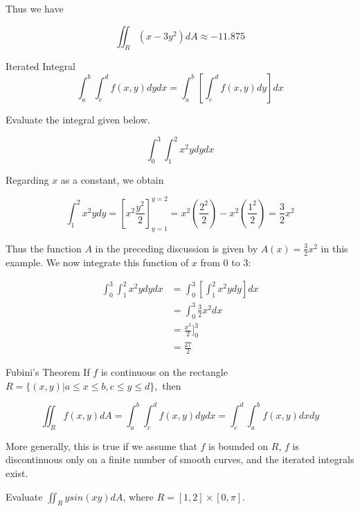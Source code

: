         Thus we have

        \[
            \iint_R (x-3y^2) dA \approx -11.875
        \]

        \begin{theorem}{Iterated Integral}
            \[
                \int_a^b \int_c^d f(x,y) dy dx = \int_a^b \left[\int_c^d f(x,y) dy\right] dx
            \]
        \end{theorem}

        \textit{} Evaluate the integral given below.

        \[
            \int_0^3 \int_1^2 x^2 y dy dx
        \]

        Regarding $x$ as a constant, we obtain

        \[
            \int_1^2 x^2 y dy = \left[x^2 \frac{y^2}{2}\right]^{y=2}_{y=1} = x^2 \left(\frac{2^2}{2}\right) - x^2\left(\frac{1^2}{2}\right) = \frac{3}{2}x^2
        \]

        Thus the function $A$ in the preceding discussion is given by $A(x) = \frac{3}{2}x^2$ in this example. We now integrate this function of $x$ from 0 to 3:

        \begin{align*}
            \int_0^3 \int_1^2 x^2 y dy dx   &= \int_0^3 \left[\int_1^2 x^2 y dy\right] dx \\
                                            &= \int_0^3 \frac{3}{2}x^2 dx \\
                                            &= \frac{x^3}{2}\Big]_0^3 \\
                                            &= \frac{27}{2}
        \end{align*}

        \begin{theorem}{Fubini's Theorem}
            If $f$ is continuous on the rectangle $R = \{(x,y) | a \leq x \leq b, c\leq y \leq d\},$ then

            \[
                \iint_R f(x,y) dA = \int_a^b \int_c^d f(x,y) dy dx = \int_c^d \int_a^b f(x,y) dx dy
            \]

            More generally, this is true if we assume that $f$ is bounded on $R$, $f$ is discontinuous only on a finite number of smooth curves, and the iterated integrals exist.
        \end{theorem}

        \textit{} Evaluate $\iint_R y sin(xy)dA$, where $R = [1,2] \times [0, \pi]$. \\


